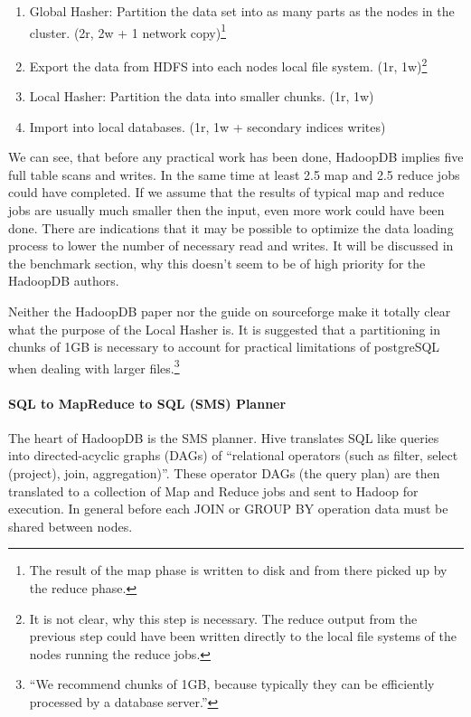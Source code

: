 \documentclass[12pt,a4paper]{scrartcl}		%
\begin{document}
\begin{enumerate}
\item Global Hasher: Partition the data set into as many parts as the nodes in the cluster. (2r, 2w + 1 network copy)\footnote{The result of the map phase is written to disk and from there picked up by the reduce phase.}
\item Export the data from HDFS into each nodes local file system. (1r, 1w)\footnote{It is not clear, why this step is necessary. The reduce output from the previous step could have been written directly to the local file systems of the nodes running the reduce jobs.}
\item Local Hasher: Partition the data into smaller chunks. (1r, 1w)
\item Import into local databases. (1r, 1w + secondary indices writes)
\end{enumerate}

We can see, that before any practical work has been done, HadoopDB implies five full table scans and writes. In the same time at least 2.5 map and 2.5 reduce jobs could have completed. If we assume that the results of typical map and reduce jobs are usually much smaller then the input, even more work could have been done. There are indications that it may be possible to optimize the data loading process to lower the number of necessary read and writes. It will be discussed in the benchmark section, why this doesn't seem to be of high priority for the HadoopDB authors.

Neither the HadoopDB paper nor the guide on sourceforge make it totally clear what the purpose of the Local Hasher is. It is suggested that a partitioning in chunks of 1GB is necessary to account for practical limitations of postgreSQL when dealing with larger files.\footnote{``We recommend chunks of 1GB, because typically they can be efficiently processed by a database server.''}

\paragraph{SQL to MapReduce to SQL (SMS) Planner}
The heart of HadoopDB is the SMS planner. Hive translates SQL like queries into directed-acyclic graphs (DAGs) of ``relational operators (such as filter, select (project), join, aggregation)''. These operator DAGs (the query plan) are then translated to a collection of Map and Reduce jobs and sent to Hadoop for execution. In general before each JOIN or GROUP BY operation data must be shared between nodes. 
\end{document}
